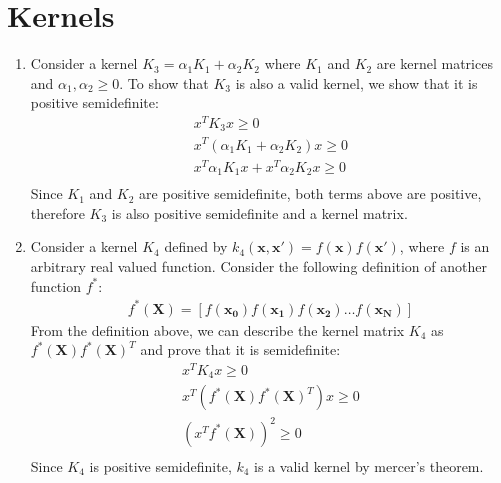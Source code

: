 \documentclass[12pt]{article}
\begin{document}
\section{Kernels}
\begin{enumerate}[label=\alph*.]
	\item Consider a kernel $K_3 = \alpha_1 K_1 + \alpha_2 K_2$ where $K_1$ and $K_2$ are kernel matrices and $\alpha_1 , \alpha_2 \geq 0$. To show that $K_3$ is also a valid kernel, we show that it is positive semidefinite:
	\begin{gather*}
		x^T K_3 x \geq 0 \\
		x^T ( \alpha_1 K_1 + \alpha_2 K_2 ) x \geq 0 \\
		x^T \alpha_1 K_1  x  + x^T \alpha_2 K_2  x \geq 0 \\
	\end{gather*}
	Since  $K_1$ and $K_2$ are positive semidefinite, both terms above are positive, therefore $K_3$ is also positive semidefinite and a kernel matrix.
	
	\item Consider a kernel $K_4$ defined by $k_4(\mathbf{x}, \mathbf{x'}) = f(\mathbf{x}) f(\mathbf{x'})$, where $f$ is an arbitrary real valued function. Consider the following definition of another function $f^*$:
	\begin{gather*}
		f^*(\mathbf{X}) = [ f(\mathbf{x_0}) f(\mathbf{x_1}) f(\mathbf{x_2}) \dots f(\mathbf{x_N}) ]
	\end{gather*} 
	From the definition above, we can describe the kernel matrix $K_4$ as $f^*(\mathbf{X}) f^*(\mathbf{X})^T$ and prove that it is semidefinite:
	\begin{gather*}
		x^T K_4 x \geq 0 \\
		x^T ( f^*(\mathbf{X}) f^*(\mathbf{X})^T ) x \geq 0 \\
		(x^T  f^*(\mathbf{X}))^2 \geq 0 \\
	\end{gather*}
	Since $K_4$ is positive semidefinite, $k_4$ is a valid kernel by mercer's theorem.
	

\end{enumerate}
\end{document}
